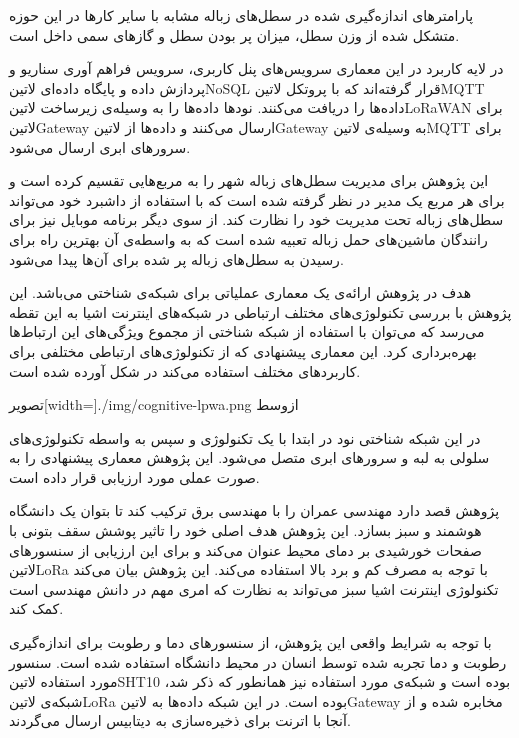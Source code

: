 پارامترهای اندازه‌گیری شده در سطل‌های زباله مشابه با سایر کارها در این حوزه متشکل شده از وزن سطل، میزان پر بودن سطل و گازهای سمی داخل است.

در لایه کاربرد در این معماری سرویس‌های پنل کاربری، سرویس فراهم آوری سناریو و پردازش داده و پایگاه داده‌ای ‌لاتین{NoSQL} قرار گرفته‌اند که با پروتکل ‌لاتین{MQTT} داده‌ها را دریافت می‌کنند.
نودها داده‌ها را به وسیله‌ی زیرساخت ‌لاتین{LoRaWAN} برای ‌لاتین{Gateway} ارسال می‌کنند و داده‌ها از ‌لاتین{Gateway} به وسیله‌ی ‌لاتین{MQTT} برای سرورهای ابری ارسال می‌شود.

این پژوهش برای مدیریت سطل‌های زباله شهر را به مربع‌هایی تقسیم کرده است و برای هر مربع یک مدیر در نظر گرفته شده است که با استفاده از داشبرد خود می‌تواند سطل‌های زباله تحت مدیریت خود را نظارت کند.
از سوی دیگر برنامه موبایل نیز برای رانندگان ماشین‌های حمل زباله تعبیه شده است که به واسطه‌ی آن بهترین راه برای رسیدن به سطل‌های زباله پر شده برای آن‌ها پیدا می‌شود.


هدف در پژوهش  ارائه‌ی یک معماری عملیاتی برای شبکه‌ی شناختی می‌باشد. این پژوهش با بررسی تکنولوژی‌های مختلف ارتباطی در شبکه‌های اینترنت اشیا به این تقطه می‌رسد که می‌توان
با استفاده از شبکه شناختی از مجموع ویژگی‌های این ارتباط‌ها بهره‌برداری کرد. این معماری پیشنهادی که از تکنولوژی‌های ارتباطی مختلفی برای کاربردهای مختلف استفاده می‌کند در شکل 
آورده شده است.

‌تصویر[width=\textwidth]{./img/cognitive-lpwa.png}
‌ازوسط

در این شبکه شناختی نود در ابتدا با یک تکنولوژی و سپس به واسطه تکنولوژی‌های سلولی به لبه و سرورهای ابری متصل می‌شود. این پژوهش معماری پیشنهادی را به صورت عملی مورد ارزیابی قرار داده است.


پژوهش  قصد دارد مهندسی عمران را با مهندسی برق ترکیب کند تا بتوان یک دانشگاه هوشمند و سبز بسازد. این پژوهش هدف اصلی خود را تاثیر پوشش سقف بتونی با صفحات خورشیدی
بر دمای محیط عنوان می‌کند و برای این ارزیابی از سنسورهای ‌لاتین{LoRa} با توجه به مصرف کم و برد بالا استفاده می‌کند. این پژوهش بیان می‌کند تکنولوژی اینترنت اشیا سبز می‌تواند به نظارت که امری مهم
در دانش مهندسی است کمک کند.

با توجه به شرایط واقعی این پژوهش، از سنسورهای دما و رطوبت برای اندازه‌گیری رطوبت و دما تجربه شده توسط انسان در محیط دانشگاه استفاده شده است.
سنسور مورد استفاده ‌لاتین{SHT10} بوده است و شبکه‌ی مورد استفاده نیز همانطور که ذکر شد، شبکه‌ی ‌لاتین{LoRa} بوده است. در این شبکه داده‌ها
به ‌لاتین{Gateway} مخابره شده و از آنجا با اترنت برای ذخیره‌سازی به دیتابیس ارسال می‌گردند.

